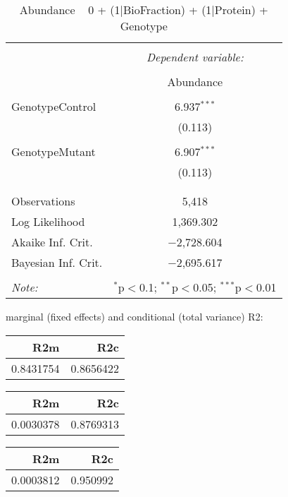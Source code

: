 \documentclass[11pt]{report}
\begin{document}
\begin{table}[!htbp] \centering 
  \caption{Abundance ~ 0 + (1|BioFraction) + (1|Protein) + Genotype} 
  \label{} 
\begin{tabular}{@{\extracolsep{5pt}}lc} 
\\[-1.8ex]\hline 
\hline \\[-1.8ex] 
 & \multicolumn{1}{c}{\textit{Dependent variable:}} \\ 
\cline{2-2} 
\\[-1.8ex] & Abundance \\ 
\hline \\[-1.8ex] 
 GenotypeControl & 6.937$^{***}$ \\ 
  & (0.113) \\ 
  & \\ 
 GenotypeMutant & 6.907$^{***}$ \\ 
  & (0.113) \\ 
  & \\ 
\hline \\[-1.8ex] 
Observations & 5,418 \\ 
Log Likelihood & 1,369.302 \\ 
Akaike Inf. Crit. & $-$2,728.604 \\ 
Bayesian Inf. Crit. & $-$2,695.617 \\ 
\hline 
\hline \\[-1.8ex] 
\textit{Note:}  & \multicolumn{1}{r}{$^{*}$p$<$0.1; $^{**}$p$<$0.05; $^{***}$p$<$0.01} \\ 
\end{tabular} 
\end{table} 
marginal (fixed effects) and conditional (total variance) R2:

\begin{tabular}{r|r}
\hline
R2m & R2c\\
\hline
0.8431754 & 0.8656422\\
\hline
\end{tabular}

\begin{tabular}{r|r}
\hline
R2m & R2c\\
\hline
0.0030378 & 0.8769313\\
\hline
\end{tabular}

\begin{tabular}{r|r}
\hline
R2m & R2c\\
\hline
0.0003812 & 0.950992\\
\hline
\end{tabular}
\end{document}
